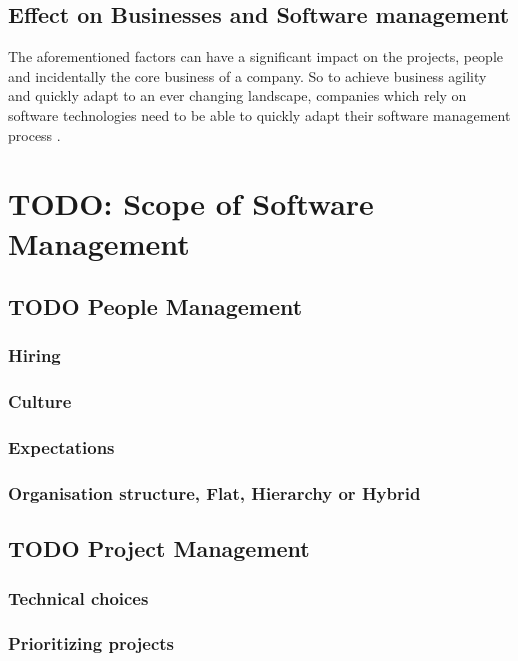\documentclass[10pt,conference]{IEEEtran}
\begin{document}
\subsection*{Effect on Businesses and Software management}

The aforementioned factors can have a significant impact on the projects, people and incidentally the core business of a company. So to achieve business agility and quickly adapt to an ever changing landscape, companies which rely on software technologies need to be able to quickly adapt their software management process \cite{mathiassen_business_2006}.

\section*{TODO: Scope of Software Management}

\subsection*{TODO People Management}

\subsubsection*{Hiring}
\subsubsection*{Culture}
\subsubsection*{Expectations}
\subsubsection*{Organisation structure, Flat, Hierarchy or Hybrid}

\subsection*{TODO Project Management}

\subsubsection*{Technical choices}
\subsubsection*{Prioritizing projects}
\end{document}
